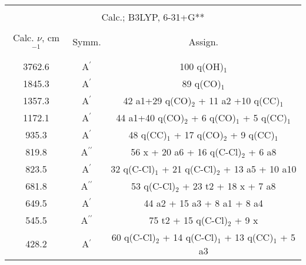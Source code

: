 \documentclass[12pt]{article}
\begin{document}
\begin{sidewaystable}[htb]
\begin{center}
\begin{tabular}{c c c}
\hline \\[-6pt]
\multicolumn{3}{c}{Calc.; B3LYP, 6-31+G**} \\[4pt]
\hline \\[-6pt]
Calc. $\nu$, cm$^{-1}$ & Symm. & Assign. \\[2pt]
\hline \\[-6pt]
3762.6 & A$^\prime$ & 100 q(OH)$_1$ \\
1845.3 & A$^\prime$ & 89 q(CO)$_1$  \\
1357.3 & A$^\prime$ & 42 a1+29 q(CO)$_2$ + 11 a2 +10 q(CC)$_1$ \\
1172.1 & A$^\prime$ & 44 a1+40 q(CO)$_2$ + 6 q(CO)$_1$ + 5 q(CC)$_1$ \\
935.3 & A$^\prime$ & 48 q(CC)$_1$ + 17 q(CO)$_2$ + 9 q(CC)$_1$ \\
819.8 & A$^{\prime\prime}$ & 56 x + 20 a6 + 16 q(C-Cl)$_2$ + 6 a8 \\
823.5 & A$^\prime$ & 32 q(C-Cl)$_1$ + 21 q(C-Cl)$_2$ + 13 a5 + 10 a10 \\
681.8 & A$^{\prime\prime}$ & 53 q(C-Cl)$_2$ + 23 t2 + 18 x + 7 a8  \\
649.5 & A$^\prime$ & 44 a2 + 15 a3 + 8 a1 + 8 a4 \\
545.5 & A$^{\prime\prime}$ & 75 t2 + 15 q(C-Cl)$_2$ + 9 x \\
428.2 & A$^\prime$ & 60 q(C-Cl)$_2$ + 14 q(C-Cl)$_1$ + 13 q(CC)$_1$ + 5 a3 \\
\hline
\end{tabular}
\end{center}
\end{sidewaystable}
\end{document}
